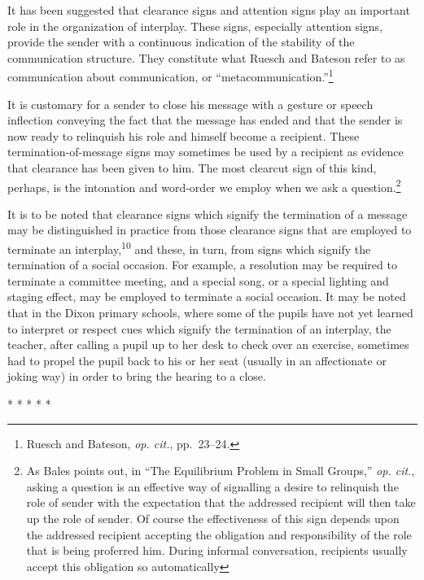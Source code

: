 \documentclass[openany,nobib]{tufte-book}
\begin{document}
It has been suggested that clearance signs and attention signs play an
important role in the organization of interplay. These signs, especially
attention signs, provide the sender with a continuous indication of the
stability of the communication structure. They constitute what Ruesch
and Bateson refer to as communication about communication, or
``metacommunication.''\footnote{Ruesch and Bateson, \emph{op. cit.},
  pp.~23--24.}

It is customary for a sender to close his message with a gesture or
speech inflection conveying the fact that the message has ended and that
the sender is now ready to relinquish his role and himself become a
recipient. These termination-of-message signs may sometimes be used by a
recipient as evidence that clearance has been given to him. The most
clearcut sign of this kind, perhaps, is the intonation and word-order we
employ when we ask a question.\footnote{As Bales points out, in ``The
  Equilibrium Problem in Small Groups,'' \emph{op. cit.}, asking a
  question is an effective way of signalling a desire to
  relinquish the role of sender with the expectation that the addressed
  recipient will then take up the role of sender. Of course the
  effectiveness of this sign depends upon the addressed recipient
  accepting the obligation and responsibility of the role that is being
  proferred him. During informal conversation, recipients usually accept
  this obligation so automatically}

It is to be noted that clearance signs which signify the termination of
a message may be distinguished in practice from those clearance signs
that are employed to terminate an interplay,\textsuperscript{10} and these, in turn, from signs which signify the
termination of a social occasion. For example, a resolution may be
required to terminate a committee meeting, and a special song, or a
special lighting and staging effect, may be employed to terminate a
social occasion. It may be noted that in the Dixon primary schools,
where some of the pupils have not yet learned to interpret or respect
cues which signify the termination of an interplay, the teacher, after
calling a pupil up to her desk to check over an exercise, sometimes had
to propel the pupil back to his or her seat (usually in an affectionate
or joking way) in order to bring the hearing to a close.

\vspace{.2in}
\begin{centering}

\Large{* * * * *}

\end{centering}
\vspace{.17in}
\end{document}
